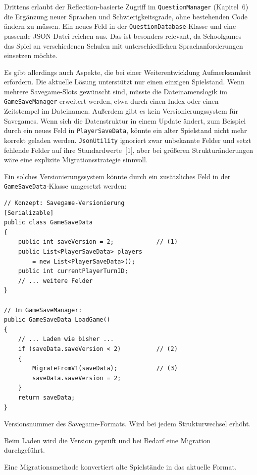 \documentclass[12pt,a4paper]{article}
\begin{document}
Drittens erlaubt der Reflection-basierte Zugriff im \texttt{QuestionManager} (Kapitel~6) die Ergänzung neuer Sprachen und Schwierigkeitsgrade, ohne bestehenden Code ändern zu müssen. Ein neues Feld in der \texttt{QuestionDatabase}-Klasse und eine passende JSON-Datei reichen aus. Das ist besonders relevant, da Schoolgames das Spiel an verschiedenen Schulen mit unterschiedlichen Sprachanforderungen einsetzen möchte.

Es gibt allerdings auch Aspekte, die bei einer Weiterentwicklung Aufmerksamkeit erfordern. Die aktuelle Lösung unterstützt nur einen einzigen Spielstand. Wenn mehrere Savegame-Slots gewünscht sind, müsste die Dateinamenslogik im \texttt{GameSaveManager} erweitert werden, etwa durch einen Index oder einen Zeitstempel im Dateinamen. Außerdem gibt es kein Versionierungssystem für Savegames. Wenn sich die Datenstruktur in einem Update ändert, zum Beispiel durch ein neues Feld in \texttt{PlayerSaveData}, könnte ein alter Spielstand nicht mehr korrekt geladen werden. \texttt{JsonUtility} ignoriert zwar unbekannte Felder und setzt fehlende Felder auf ihre Standardwerte~[1], aber bei größeren Strukturänderungen wäre eine explizite Migrationsstrategie sinnvoll.

Ein solches Versionierungssystem könnte durch ein zusätzliches Feld in der \texttt{GameSaveData}-Klasse umgesetzt werden:

\begin{lstlisting}
// Konzept: Savegame-Versionierung
[Serializable]
public class GameSaveData
{
    public int saveVersion = 2;            // (1)
    public List<PlayerSaveData> players
        = new List<PlayerSaveData>();
    public int currentPlayerTurnID;
    // ... weitere Felder
}

// Im GameSaveManager:
public GameSaveData LoadGame()
{
    // ... Laden wie bisher ...
    if (saveData.saveVersion < 2)          // (2)
    {
        MigrateFromV1(saveData);           // (3)
        saveData.saveVersion = 2;
    }
    return saveData;
}
\end{lstlisting}

\begin{description}[leftmargin=2em, labelwidth=1.5em]
    \item[(1)] Versionsnummer des Savegame-Formats. Wird bei jedem Strukturwechsel erhöht.
    \item[(2)] Beim Laden wird die Version geprüft und bei Bedarf eine Migration durchgeführt.
    \item[(3)] Eine Migrationsmethode konvertiert alte Spielstände in das aktuelle Format.
\end{description}
\end{document}
